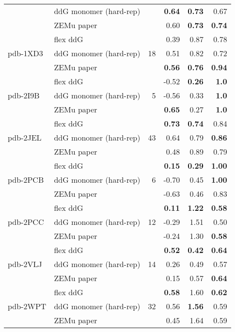 \begin{longtable}{llrrrr}
 & ddG monomer (hard-rep) & & \textbf{0.64} & \textbf{0.73} & 0.67  \\
 & ZEMu paper & & 0.60 & \textbf{0.73} & \textbf{0.74}  \\
\hline
 \multirow{ 3}{*}{pdb-1XD3} & flex ddG & \multirow{ 3}{*}{18} & 0.39 & 0.87 & 0.78  \\
 & ddG monomer (hard-rep) & & 0.51 & 0.82 & 0.72  \\
 & ZEMu paper & & \textbf{0.56} & \textbf{0.76} & \textbf{0.94}  \\
\hline
 \multirow{ 3}{*}{pdb-2I9B} & flex ddG & \multirow{ 3}{*}{5} & -0.52 & \textbf{0.26} & \textbf{1.0}  \\
 & ddG monomer (hard-rep) & & -0.56 & 0.33 & \textbf{1.0}  \\
 & ZEMu paper & & \textbf{0.65} & 0.27 & \textbf{1.0}  \\
\hline
 \multirow{ 3}{*}{pdb-2JEL} & flex ddG & \multirow{ 3}{*}{43} & \textbf{0.73} & \textbf{0.74} & 0.84  \\
 & ddG monomer (hard-rep) & & 0.64 & 0.79 & \textbf{0.86}  \\
 & ZEMu paper & & 0.48 & 0.89 & 0.79  \\
\hline
 \multirow{ 3}{*}{pdb-2PCB} & flex ddG & \multirow{ 3}{*}{6} & \textbf{0.15} & \textbf{0.29} & \textbf{1.00}  \\
 & ddG monomer (hard-rep) & & -0.70 & 0.45 & \textbf{1.00}  \\
 & ZEMu paper & & -0.63 & 0.46 & 0.83  \\
\hline
 \multirow{ 3}{*}{pdb-2PCC} & flex ddG & \multirow{ 3}{*}{12} & \textbf{0.11} & \textbf{1.22} & \textbf{0.58}  \\
 & ddG monomer (hard-rep) & & -0.29 & 1.51 & 0.50  \\
 & ZEMu paper & & -0.24 & 1.30 & \textbf{0.58}  \\
\hline
 \multirow{ 3}{*}{pdb-2VLJ} & flex ddG & \multirow{ 3}{*}{14} & \textbf{0.52} & \textbf{0.42} & \textbf{0.64}  \\
 & ddG monomer (hard-rep) & & 0.26 & 0.49 & 0.57  \\
 & ZEMu paper & & 0.15 & 0.57 & \textbf{0.64}  \\
\hline
 \multirow{ 3}{*}{pdb-2WPT} & flex ddG & \multirow{ 3}{*}{32} & \textbf{0.58} & 1.60 & \textbf{0.62}  \\
 & ddG monomer (hard-rep) & & 0.56 & \textbf{1.56} & 0.59  \\
 & ZEMu paper & & 0.45 & 1.64 & 0.59  \\

\end{longtable}
